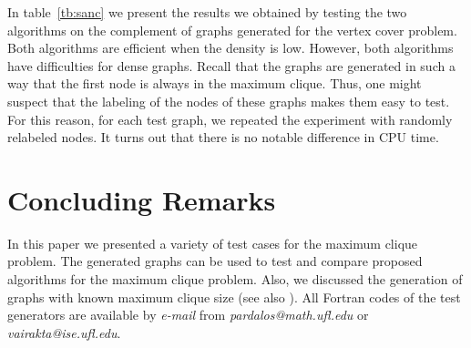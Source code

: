 In table~\ref{tb:sanc} we present the results we obtained by testing the two
algorithms on the complement of graphs generated for the vertex cover problem.
Both algorithms are efficient when the density is low. However, both algorithms
have difficulties for dense graphs.
Recall that the graphs are generated in such a way that the first node is
always in the maximum clique. Thus, one might suspect that the labeling of the
nodes of these graphs makes them easy to test. For this reason, for each test
graph, we repeated the experiment with randomly relabeled nodes. It turns out
that there is no notable difference in CPU time.

\section{Concluding Remarks}

In this paper we presented a variety of test cases for the maximum clique
problem. The generated graphs can be used to test and compare proposed
algorithms for the maximum clique problem. Also, we discussed the generation
of graphs with known maximum clique size (see also \cite{Par}). All Fortran
codes of the test generators are available by {\it e-mail} from
{\it pardalos@math.ufl.edu} or {\it vairakta@ise.ufl.edu}.

